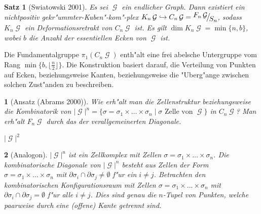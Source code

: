 \documentclass[paper=A4, twoside, chapterprefix=true, bibliography=totoc, headsepline]{scrbook}
\newcommand{\tikzgitter}[3][0.25]{ %
	\draw[step=#1,gray!15] #2 grid #3;
	\draw[step=2*#1,gray!30] #2 grid #3;
	\fill (0,0) circle(0.1); 
}
\DeclareMathOperator{\calG}{{\mathcal{G}}}
\newcommand{\G}{\calG}
\newcommand{\X}{\times}
\newcommand{\FakRaum}[2]{
	\raisebox{0.7ex}{\ensuremath{#1}}
	\ensuremath{\mkern-3mu}\big/\ensuremath{\mkern-3mu}
	\raisebox{-0.6ex}{\ensuremath{#2}}}
\theoremstyle{nonumberbreak}
\newtheorem{satz}{Satz}
\theoremstyle{emptybreak}
\newtheorem{emptythm}{}%
\theoremstyle{break}
\newcommand{\quot}[1]{\text{\glqq}{#1}\text{\grqq}}
\begin{document}
\begin{satz}[Swiatowski 2001]
Es sei $\G$ ein endlicher Graph.
Dann existiert ein nichtpositiv gekr"ummter-Kuben"-kom"-plex $K_n\G \hookrightarrow C_n\G = \FakRaum{F_n\calG}{S_n}$, sodass $K_n\calG$ ein Deformationsretrakt von $C_n\G$ ist.
Es gilt $\dim K_n\calG = \min \{n, b\}$, wobei $b$ die Anzahl der essentiellen Ecken von $\G$ ist.
\end{satz}


Die Fundamentalgruppe $\pi_1(C_n\G)$ enth"alt eine frei abelsche Untergruppe vom Rang $\min\{b, \lfloor \frac{n}{2} \rfloor\}$.
Die Konstruktion basiert darauf, die Verteilung von Punkten auf Ecken, beziehungsweise Kanten, beziehungsweise die "Uberg"ange zwischen solchen Zust"anden zu beschreiben.

\begin{emptythm}[Ansatz (Abrams 2000)]
Wie erh"alt man die Zellenstruktur beziehungsweise die Kombinatorik von $|\G|^n = \{ \sigma = \sigma_1 \X \ldots \X \sigma_n \mid \sigma \text{ Zelle von } \G \}$ in $C_n\G$?
Man erh"alt $F_n\G$ durch das \quot{L"oschen} der verallgemeinerten Diagonale.
\begin{center} $|\G|^2$\end{center}
\end{emptythm}

\begin{emptythm}[Analogon]
$|\G|^n$ ist ein Zellkomplex mit Zellen $\sigma = \sigma_1 \X \ldots \X \sigma_n$.
Die kombinatorische Diagonale von $|\G|^n$ besteht aus Zellen der Form $\sigma = \sigma_1 \X \ldots \X \sigma_n$ mit $\partial\sigma_i \cap \partial\sigma_j \ne \emptyset$ f"ur ein $i \ne j$.
Betrachten den kombinatorischen Konfigurationsraum mit Zellen $\sigma = \sigma_1 \X \ldots \X \sigma_n$ mit $\partial\sigma_i \cap \partial\sigma_j = \emptyset$ f"ur alle $i \ne j$.
Dies sind genau die $n$-Tupel von Punkten, welche paarweise durch eine (offene) Kante getrennt sind.
\end{emptythm}
\end{document}
